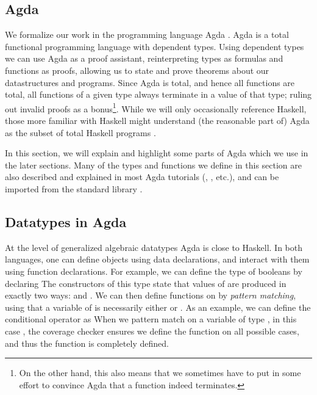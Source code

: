 \subsection{Agda}\label{sec:background-agda}
We formalize our work in the programming language Agda \cite{agda}. Agda is a total functional programming language with dependent types. Using dependent types we can use Agda as a proof assistant, reinterpreting types as formulas and functions as proofs, allowing us to state and prove theorems about our datastructures and programs. Since Agda is total, and hence all functions are total, all functions of a given type always terminate in a value of that type; ruling out invalid proofs as a bonus\footnote{On the other hand, this also means that we sometimes have to put in some effort to convince Agda that a function indeed terminates.}. While we will only occasionally reference Haskell, those more familiar with Haskell might understand (the reasonable part of) Agda as the subset of total Haskell programs \cite{agda2hs}.

In this section, we will explain and highlight some parts of Agda which we use in the later sections. Many of the types and functions we define in this section are also described and explained in most Agda tutorials (\cite{ulftutorial}, \cite{plfa}, etc.), and can be imported from the standard library \cite{agdastdlib}.


\subsection{Datatypes in Agda}\label{sec:background-data}
At the level of generalized algebraic datatypes Agda is close to Haskell. In both languages, one can define objects using data declarations, and interact with them using function declarations. For example, we can define the type of booleans by declaring
The constructors of this type state that values of  are produced in exactly two ways:  and . We can then define functions on  by \emph{pattern matching}, using that a variable of  is necessarily either  or . As an example, we can define the conditional operator as
When we pattern match on a variable of type , in this case , the coverage checker ensures we define the function on all possible cases, and thus the function is completely defined.

